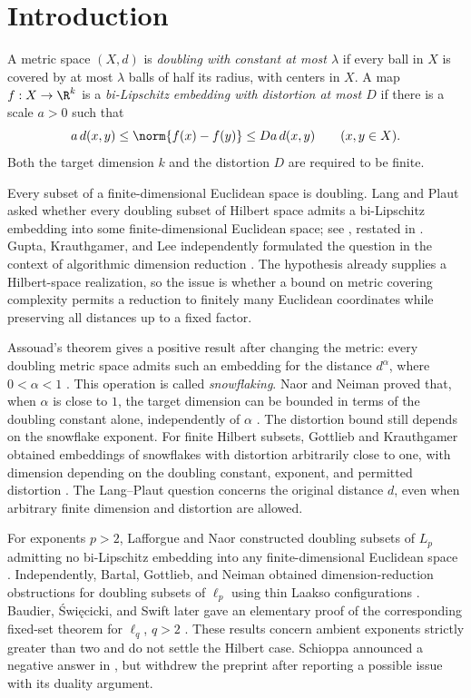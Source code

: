 \section{Introduction}
\label{sec:introduction}
A metric space $(X,d)$ is \emph{doubling with constant at most $\lambda$} if every ball in $X$ is covered by at most $\lambda$ balls of half its radius, with centers in $X$. A map $f:X\to\R^k$ is a \emph{bi-Lipschitz embedding with distortion at most $D$} if there is a scale $a>0$ such that
\[
 a\,d(x,y)\le\norm{f(x)-f(y)}\le Da\,d(x,y)
 \qquad(x,y\in X).
\]
Both the target dimension $k$ and the distortion $D$ are required to be finite.

Every subset of a finite-dimensional Euclidean space is doubling. Lang and Plaut asked whether every doubling subset of Hilbert space admits a bi-Lipschitz embedding into some finite-dimensional Euclidean space; see \cite[Question 2.4]{LP}, restated in \cite[Question 1]{NN}. Gupta, Krauthgamer, and Lee independently formulated the question in the context of algorithmic dimension reduction \cite[Section 6, Question 1]{GKL}. The hypothesis already supplies a Hilbert-space realization, so the issue is whether a bound on metric covering complexity permits a reduction to finitely many Euclidean coordinates while preserving all distances up to a fixed factor.

Assouad's theorem gives a positive result after changing the metric: every doubling metric space admits such an embedding for the distance $d^\alpha$, where $0<\alpha<1$ \cite{Assouad}. This operation is called \emph{snowflaking}. Naor and Neiman proved that, when $\alpha$ is close to $1$, the target dimension can be bounded in terms of the doubling constant alone, independently of $\alpha$ \cite[Theorem 1.2]{NN}. The distortion bound still depends on the snowflake exponent. For finite Hilbert subsets, Gottlieb and Krauthgamer obtained embeddings of snowflakes with distortion arbitrarily close to one, with dimension depending on the doubling constant, exponent, and permitted distortion \cite[Theorem 1.2]{GK}. The Lang--Plaut question concerns the original distance $d$, even when arbitrary finite dimension and distortion are allowed.

For exponents $p>2$, Lafforgue and Naor constructed doubling subsets of $L_p$ admitting no bi-Lipschitz embedding into any finite-dimensional Euclidean space \cite[Theorem 1.1]{LN}. Independently, Bartal, Gottlieb, and Neiman obtained dimension-reduction obstructions for doubling subsets of $\ell_p$ using thin Laakso configurations \cite{BGN}. Baudier, \'Swi\k{e}cicki, and Swift later gave an elementary proof of the corresponding fixed-set theorem for $\ell_q$, $q>2$ \cite[Theorem 1]{BSS}. These results concern ambient exponents strictly greater than two and do not settle the Hilbert case. Schioppa announced a negative answer in \cite{Schioppa}, but withdrew the preprint after reporting a possible issue with its duality argument.


